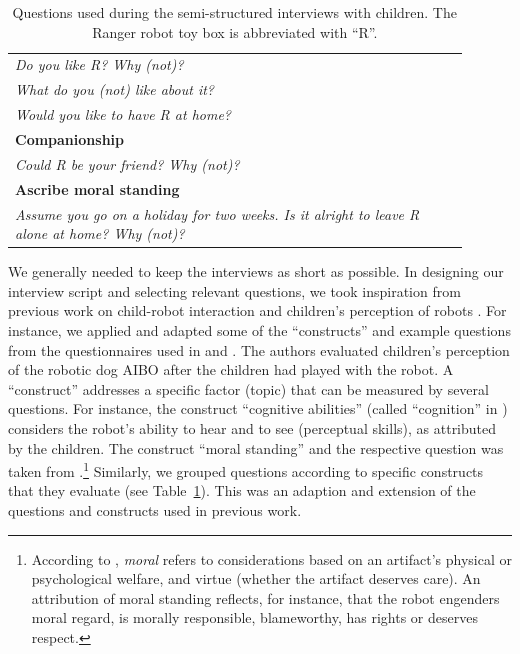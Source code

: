 \documentclass{sig-alternate}
\begin{document}
\begin{table}[h]
\begin{tabular}{p{0.9\linewidth}}
    \emph{Do you like R? Why (not)?} \\
    \emph{What do you (not) like about it?} \\
    \emph{Would you like to have R at home?} \\

    \toprule
    \textbf{Companionship} \\
    \midrule


    \emph{Could R be your friend? Why (not)?}\\

    \toprule
    \textbf{Ascribe moral standing} \\
    \midrule


    \emph{Assume you go on a holiday for two weeks. Is it alright to leave R
    alone at home? Why (not)?} \\

    \bottomrule

\end{tabular}

    \caption{\small Questions used during the semi-structured interviews
    with children. The Ranger robot toy box is abbreviated with ``R''.}

    \label{tab:domino-questions} 

\end{table}

We generally needed to keep the interviews as short as possible. In designing
our interview script and selecting relevant questions, we took inspiration from
previous work on child-robot interaction and children's perception of robots
\cite{kahn_jr._robotic_2006,weiss_i_2009,leite_influence_2013}. For instance, we
applied and adapted some of the ``constructs'' and example questions from the
questionnaires used in \cite{kahn_jr._robotic_2006} and \cite{weiss_i_2009}. The
authors evaluated children's perception of the robotic dog AIBO after the
children had played with the robot. A ``construct'' addresses a specific factor
(topic) that can be measured by several questions. For instance, the construct
``cognitive abilities'' (called ``cognition'' in \cite{weiss_i_2009}) considers
the robot's ability to hear and to see (perceptual skills), as attributed by the
children. The construct ``moral standing'' and the respective question was taken
from \cite{kahn_jr._robotic_2006}.\footnote{According to
\cite{kahn_jr._robotic_2006}, \textit{moral} refers to considerations based on
an artifact's physical or psychological welfare, and virtue (whether the
artifact deserves care). An attribution of moral standing reflects, for
instance, that the robot engenders moral regard, is morally responsible,
blameworthy, has rights or deserves respect.}			Similarly, we grouped
questions according to specific constructs that they evaluate (see
Table~\ref{tab:domino-questions}). This was an adaption and extension of the
questions and constructs used in previous work.\\
\end{document}
